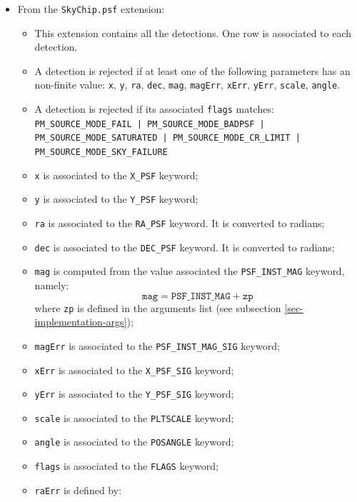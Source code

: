 \documentclass[panstarrs,spec]{panstarrs}
\begin{document}
\begin{itemize}
\begin{itemize}
    \texttt{IMNAXIS2}, that is the number of rows of the original
    image;
  \end{itemize}
\item From the \texttt{SkyChip.psf} extension:
  \begin{itemize}
  \item This extension contains all the detections. One row is
    associated to each detection.
  \item A detection is rejected if at least one of the following
    parameters has an non-finite value: \texttt{x}, \texttt{y},
    \texttt{ra}, \texttt{dec}, \texttt{mag}, \texttt{magErr},
    \texttt{xErr}, \texttt{yErr}, \texttt{scale}, \texttt{angle}.
  \item A detection is rejected if its associated \texttt{flags}
    matches:
    {\small
    \texttt{PM\_SOURCE\_MODE\_FAIL | PM\_SOURCE\_MODE\_BADPSF |
      PM\_SOURCE\_MODE\_SATURATED | PM\_SOURCE\_MODE\_CR\_LIMIT |
      PM\_SOURCE\_MODE\_SKY\_FAILURE}}
  \item \texttt{x} is associated to the \texttt{X\_PSF} keyword;
  \item \texttt{y} is associated to the \texttt{Y\_PSF} keyword;
  \item \texttt{ra} is associated to the \texttt{RA\_PSF} keyword. It
    is converted to radians;
  \item \texttt{dec} is associated to the \texttt{DEC\_PSF} keyword. It
    is converted to radians;
  \item \texttt{mag} is computed from the value associated the
    \texttt{PSF\_INST\_MAG} keyword, namely:
    \[
    \mathtt{mag} = \mathtt{PSF\_INST\_MAG} + \mathtt{zp}
    \]
    where \texttt{zp} is defined in the arguments list (see subsection
    \ref{sec-implementation-args});
  \item \texttt{magErr} is associated to the
    \texttt{PSF\_INST\_MAG\_SIG} keyword;
  \item \texttt{xErr} is associated to the \texttt{X\_PSF\_SIG}
    keyword;
  \item \texttt{yErr} is associated to the \texttt{Y\_PSF\_SIG}
    keyword;
  \item \texttt{scale} is associated to the \texttt{PLTSCALE}
    keyword;
  \item \texttt{angle} is associated to the \texttt{POSANGLE}
    keyword;
  \item \texttt{flags} is associated to the \texttt{FLAGS} keyword;
  \item \texttt{raErr} is defined by: 

\end{itemize}
\end{itemize}
\end{document}

